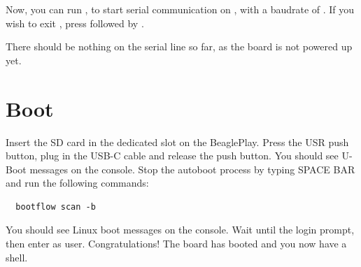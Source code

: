 Now, you can run , to start serial
communication on , with a baudrate of . If
you wish to exit , press \code{[Ctrl][a]} followed by
\code{[Ctrl][x]}.

There should be nothing on the serial line so far, as the board is not
powered up yet.

\section{Boot}

Insert the SD card in the dedicated slot on the BeaglePlay. Press the USR
push button, plug in the USB-C cable and
release the push button. You should see U-Boot messages on the console.
Stop the autoboot process by typing SPACE BAR and run the following commands:

\begin{verbatim}
  bootflow scan -b
\end{verbatim}

You should see Linux boot messages on the console.
Wait until the login prompt, then enter  as user.
Congratulations! The board has booted and you now have a shell.
